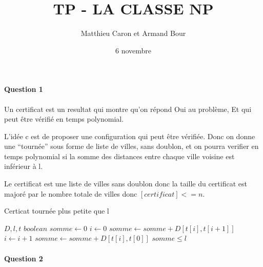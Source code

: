 \documentclass[a4paper,10pt]{article}
\title{TP - LA CLASSE NP}
\author{Matthieu Caron et Armand Bour}
\date{6 novembre}
\begin{document}
\maketitle

\paragraph{Question 1}
Un certificat est un resultat qui montre qu'on répond Oui au problème,
Et qui peut être vérifié en temps polynomial.

L'idée c est de proposer une configuration qui peut être vérifiée.
Donc on donne une ``tournée'' sous forme de liste de villes, sans doublon,
et on pourra verifier en temps polynomial si la somme des distances entre chaque ville
voisine est inférieur à l.

Le certificat est une liste de villes sans doublon donc la taille du certificat est majoré
par le nombre totale de villes donc $[certificat]<=n$.



\begin{algorithm}
\caption{Certicat tournée plus petite que l}
\begin{algorithmic}
\REQUIRE $D, l, t$
\ENSURE $boolean$
\STATE $somme \leftarrow 0$
\STATE $i \leftarrow 0$
  \STATE $somme \leftarrow somme + D[t[i],t[i+1]] $
  \STATE $i \leftarrow i + 1 $
\ENDWHILE
\STATE $somme \leftarrow somme + D[t[i],t[0]] $
\RETURN $somme \leq l $ 
\end{algorithmic}
\end{algorithm}

\paragraph{Question 2}
\end{document}
